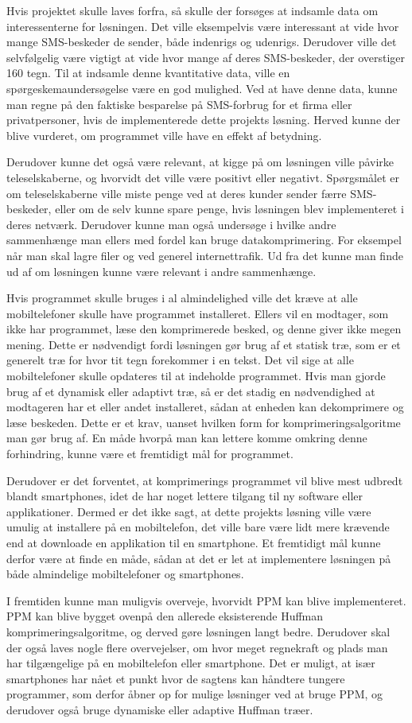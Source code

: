 Hvis projektet skulle laves forfra, så skulle der forsøges at indsamle data om interessenterne for løsningen. Det ville eksempelvis være interessant at vide hvor mange SMS-beskeder de sender, både indenrigs og udenrigs. Derudover ville det selvfølgelig være vigtigt at vide hvor mange af deres SMS-beskeder, der overstiger 160 tegn. Til at indsamle denne kvantitative data, ville en spørgeskemaundersøgelse være en god mulighed. Ved at have denne data, kunne man regne på den faktiske besparelse på SMS-forbrug for et firma eller privatpersoner, hvis de implementerede dette projekts løsning. Herved kunne der blive vurderet, om programmet ville have en effekt af betydning. 

Derudover kunne det også være relevant, at kigge på om løsningen ville påvirke teleselskaberne, og hvorvidt det ville være positivt eller negativt. Spørgsmålet er om teleselskaberne ville miste penge ved at deres kunder sender færre SMS-beskeder, eller om de selv kunne spare penge, hvis løsningen blev implementeret i deres netværk. Derudover kunne man også undersøge i hvilke andre sammenhænge man ellers med fordel kan bruge datakomprimering. For eksempel når man skal lagre filer og ved generel internettrafik. Ud fra det kunne man finde ud af om løsningen kunne være relevant i andre sammenhænge.

Hvis programmet skulle bruges i al almindelighed ville det kræve at alle mobiltelefoner skulle have programmet installeret. Ellers vil en modtager, som ikke har programmet, læse den komprimerede besked, og denne giver ikke megen mening. Dette er nødvendigt fordi løsningen gør brug af et statisk træ, som er et generelt træ for hvor tit tegn forekommer i en tekst. Det vil sige at alle mobiltelefoner skulle opdateres til at indeholde programmet. Hvis man gjorde brug af et dynamisk eller adaptivt træ, så er det stadig en nødvendighed at modtageren har et eller andet installeret, sådan at enheden kan dekomprimere og læse beskeden. Dette er et krav, uanset hvilken form for komprimeringsalgoritme man gør brug af. En måde hvorpå man kan lettere komme omkring denne forhindring, kunne være et fremtidigt mål for programmet.
 
Derudover er det forventet, at komprimerings programmet vil  blive mest udbredt blandt smartphones, idet de har noget lettere tilgang til ny software eller applikationer. Dermed er det ikke sagt, at dette projekts løsning ville være umulig at installere på en mobiltelefon, det ville bare være lidt mere krævende end at downloade en applikation til en smartphone. Et fremtidigt mål kunne derfor være at finde en måde, sådan at det er let at implementere løsningen på både almindelige mobiltelefoner og smartphones. 
  
I fremtiden kunne man muligvis overveje, hvorvidt PPM kan blive implementeret. PPM kan blive bygget ovenpå den allerede eksisterende Huffman komprimeringsalgoritme, og derved gøre løsningen langt bedre. Derudover skal der også laves nogle flere overvejelser, om hvor meget regnekraft og plads man har tilgængelige på en mobiltelefon eller smartphone. Det er muligt, at især smartphones har nået et punkt hvor de sagtens kan håndtere tungere programmer, som derfor åbner op for mulige løsninger ved at bruge PPM, og derudover også bruge dynamiske eller adaptive Huffman træer.
